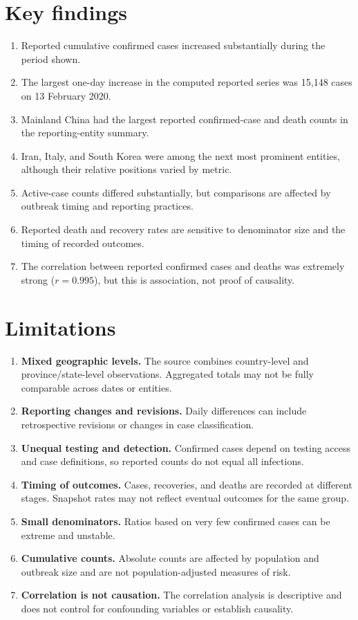 \documentclass[11pt,a4paper]{article}
\begin{document}
\section{Key findings}
\begin{enumerate}
\item Reported cumulative confirmed cases increased substantially during the period shown.
\item The largest one-day increase in the computed reported series was 15,148 cases on 13 February 2020.
\item Mainland China had the largest reported confirmed-case and death counts in the reporting-entity summary.
\item Iran, Italy, and South Korea were among the next most prominent entities, although their relative positions varied by metric.
\item Active-case counts differed substantially, but comparisons are affected by outbreak timing and reporting practices.
\item Reported death and recovery rates are sensitive to denominator size and the timing of recorded outcomes.
\item The correlation between reported confirmed cases and deaths was extremely strong ($r=0.995$), but this is association, not proof of causality.
\end{enumerate}

\section{Limitations}
\begin{enumerate}
\item \textbf{Mixed geographic levels.} The source combines country-level and province/state-level observations. Aggregated totals may not be fully comparable across dates or entities.
\item \textbf{Reporting changes and revisions.} Daily differences can include retrospective revisions or changes in case classification.
\item \textbf{Unequal testing and detection.} Confirmed cases depend on testing access and case definitions, so reported counts do not equal all infections.
\item \textbf{Timing of outcomes.} Cases, recoveries, and deaths are recorded at different stages. Snapshot rates may not reflect eventual outcomes for the same group.
\item \textbf{Small denominators.} Ratios based on very few confirmed cases can be extreme and unstable.
\item \textbf{Cumulative counts.} Absolute counts are affected by population and outbreak size and are not population-adjusted measures of risk.
\item \textbf{Correlation is not causation.} The correlation analysis is descriptive and does not control for confounding variables or establish causality.
\end{enumerate}
\end{document}
